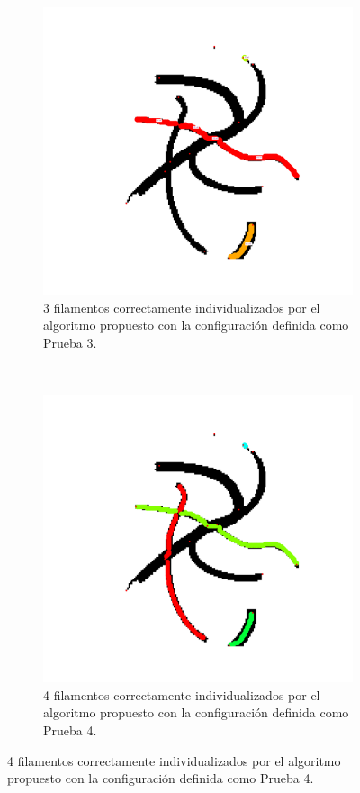 \begin{figure}[h!]
    \begin{subfigure}[t]{0.49\textwidth}
        \centering
        \includegraphics[scale=0.11]{resultImages/define-weighted-4-phil-s0-v05-exactMatch-antLabeled.png}
        \caption{3 filamentos correctamente individualizados por el algoritmo propuesto con la configuraci\'on definida como Prueba 3.}
        \label{fig:SynthDefine-Individualizacion-BestP1}
    \end{subfigure}
    ~
    \begin{subfigure}[t]{0.49\textwidth}
        \centering
        \includegraphics[scale=0.11]{resultImages/define-weighted-4-phil-s3389-v056-exactMatch-antLabeled.png}
        \caption{4 filamentos correctamente individualizados por el algoritmo propuesto con la configuraci\'on definida como Prueba 4.}
        \label{fig:SynthDefine-Individualizacion-BestP2}
    \end{subfigure}
    

\end{figure}
